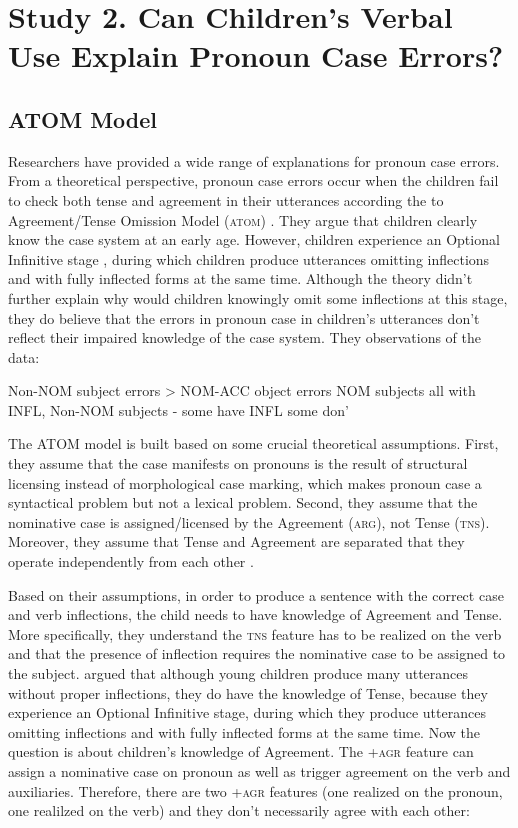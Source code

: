 \section{Study 2. Can Children's Verbal Use Explain Pronoun Case Errors? }
\subsection{ATOM Model}
Researchers have provided a wide range of explanations for pronoun case errors. From a theoretical perspective, pronoun case errors occur when the children fail to check both tense and agreement in their utterances according the to Agreement/Tense Omission Model (\textsc{atom}) \citep{wexler1998,wexler1998}. They argue that children clearly know the case system at an early age. However, children experience an Optional Infinitive stage \citep{wexler1994}, during which children produce utterances omitting inflections and with fully inflected forms at the same time. Although the theory didn't further explain why would children knowingly omit some inflections at this stage, they do believe that the errors in pronoun case in children's utterances don't reflect their impaired knowledge of the case system. They observations of the data:
\begin{exe}
\ex Non-NOM subject errors > NOM-ACC object errors 
\ex NOM subjects all with INFL, Non-NOM subjects - some have INFL some don'
\end{exe}

The ATOM model is built based on some crucial theoretical assumptions. First, they assume that the case manifests on pronouns is the result of structural licensing instead of morphological case marking, which makes pronoun case a syntactical problem but not a lexical problem. Second, they assume that the nominative case is assigned/licensed by the Agreement (\textsc{arg}), not Tense (\textsc{tns}). Moreover, they assume that Tense and Agreement are separated that they operate independently from each other \citep{chomsky1993minimalist}. 

Based on their assumptions, in order to produce a sentence with the correct case and verb inflections, the child needs to have knowledge of Agreement and Tense. More specifically, they understand the \textsc{tns} feature has to be realized on the verb and that the presence of inflection requires the nominative case to be assigned to the subject. \cite{wexler1994,wexler1996,wexler1998,wexler2000} argued that although young children produce many utterances without proper inflections, they do have the knowledge of Tense, because they experience an Optional Infinitive stage, during which they produce utterances omitting inflections and with fully inflected forms at the same time. Now the question is about children's knowledge of Agreement. The \textsc{+agr} feature can assign a nominative case on pronoun as well as trigger agreement on the verb and auxiliaries. 
Therefore, there are two \textsc{+agr} features (one realized on the pronoun, one realilzed on the verb) and they don't necessarily agree with each other:


